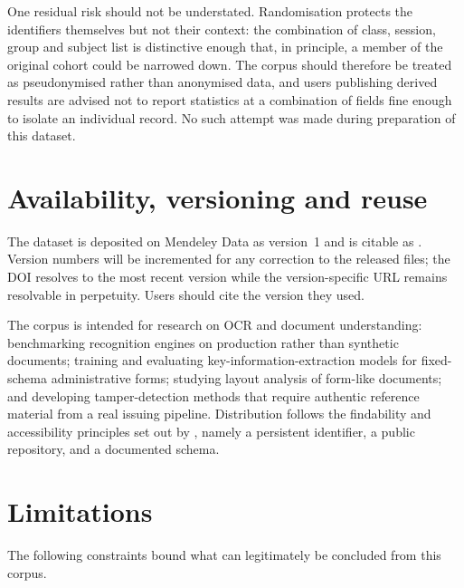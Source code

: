 \documentclass[a4paper,fleqn]{cas-dc}
\begin{document}
One residual risk should not be understated. Randomisation protects the
identifiers themselves but not their context: the combination of class,
session, group and subject list is distinctive enough that, in principle, a
member of the original cohort could be narrowed down. The corpus should
therefore be treated as pseudonymised rather than anonymised data, and users
publishing derived results are advised not to report statistics at a
combination of fields fine enough to isolate an individual record. No such
attempt was made during preparation of this dataset.

\section{Availability, versioning and reuse}

The dataset is deposited on Mendeley Data as version~1 and is citable as
\citet{ashadzzaman2026}. Version numbers will be incremented for any
correction to the released files; the DOI resolves to the most recent version
while the version-specific URL remains resolvable in perpetuity. Users should
cite the version they used.

The corpus is intended for research on OCR and document understanding:
benchmarking recognition engines on production rather than synthetic
documents; training and evaluating key-information-extraction models for
fixed-schema administrative forms; studying layout analysis of form-like
documents; and developing tamper-detection methods that require authentic
reference material from a real issuing pipeline. Distribution follows the
findability and accessibility principles set out by \citet{wilkinson2016},
namely a persistent identifier, a public repository, and a documented schema.

\section{Limitations}

The following constraints bound what can legitimately be concluded from this
corpus.
\end{document}
